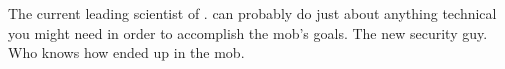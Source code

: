 \documentclass[blue]{guildcamp3}
\begin{document}
\begin{members}
	\member{\cSciOne{\intro}} The current leading scientist of \bTechWorld{}. \cSciOne{\They} can probably do just about anything technical you might need in order to accomplish the mob's goals. 
	\member{\cSpecOpTwo{\intro}} The new security guy. Who knows how \cSpecOpTwo{\they} ended up in the mob.

\end{members}
\end{document}
